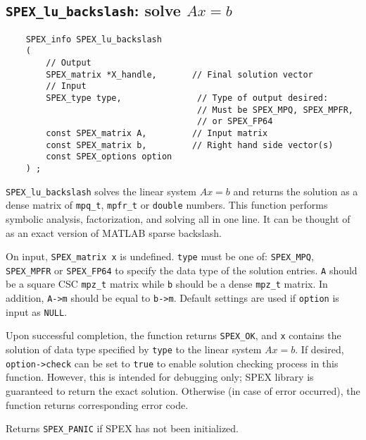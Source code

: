 \documentclass[12pt]{report}
\theoremstyle{definition}
\begin{document}
\cprotect\subsection{\verb|SPEX_lu_backslash|: solve $Ax=b$}
\label{ss:SPEX_lu_backslash}

\begin{mdframed}[userdefinedwidth=6in]
{\footnotesize
\begin{verbatim}
    SPEX_info SPEX_lu_backslash
    (
        // Output
        SPEX_matrix *X_handle,       // Final solution vector
        // Input
        SPEX_type type,               // Type of output desired:
                                      // Must be SPEX_MPQ, SPEX_MPFR,
                                      // or SPEX_FP64
        const SPEX_matrix A,         // Input matrix
        const SPEX_matrix b,         // Right hand side vector(s)
        const SPEX_options option
    ) ;
\end{verbatim}
} \end{mdframed}

\verb|SPEX_lu_backslash| solves the linear system $Ax=b$ and returns the solution
as a dense matrix of \verb|mpq_t|, \verb|mpfr_t| or \verb|double| numbers. This
function performs symbolic analysis, factorization, and solving all in one line.
It can be thought of as an exact version of MATLAB sparse backslash.

On input, \verb|SPEX_matrix x| is undefined. \verb|type| must be one of:
\verb|SPEX_MPQ|, \verb|SPEX_MPFR| or \verb|SPEX_FP64| to specify the data type
of the solution entries. \verb|A| should be a square CSC \verb|mpz_t| matrix
while \verb|b| should be a dense \verb|mpz_t| matrix. In addition, \verb|A->m|
should be equal to \verb|b->m|.  Default settings are used if
\verb|option| is input as \verb|NULL|.

Upon successful completion, the function returns \verb|SPEX_OK|, and
\verb|x| contains the solution of data type specified by
\verb|type| to the linear system $Ax=b$. If desired, \verb|option->check| can
be set to \verb|true| to enable solution checking process in this function.
However, this is intended for debugging only; SPEX library is guaranteed to
return the exact solution. Otherwise (in case of error occurred), the function
returns corresponding error code.

Returns \verb|SPEX_PANIC| if SPEX has not been initialized.
\end{document}
